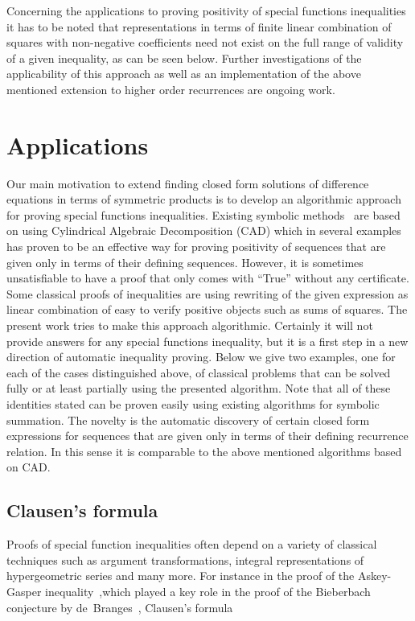\documentclass{article}
\begin{document}
Concerning the applications to proving positivity of special functions inequalities it has
to be noted that representations in terms of finite linear combination of squares with non-negative
coefficients need not exist on the full range of validity of a given inequality, as can be
seen below. Further investigations of the applicability of this approach as well as an
implementation of the above mentioned extension to higher order recurrences are ongoing
work.

\section{Applications}
\label{apps}
Our main motivation to extend finding closed form solutions of difference equations in
terms of symmetric products is to develop an algorithmic approach for proving special
functions inequalities. Existing symbolic methods~\cite{GKIneq,MKSumCracker,MKVP10} are
based on using Cylindrical Algebraic Decomposition (CAD) which in several examples has
proven to be an effective way for proving positivity of sequences that are given only in
terms of their defining sequences. However, it is sometimes unsatisfiable to have a proof
that only comes with ``True'' without any certificate. Some classical proofs of
inequalities are using rewriting of the given expression as linear combination of easy to
verify positive objects such as sums of squares. The present work tries to make this
approach algorithmic. Certainly it will not provide answers for any special functions
inequality, but it is a first step in a new direction of automatic inequality proving.
Below we give two examples, one for each of the cases distinguished above, of classical
problems that can be solved fully or at least partially using the presented algorithm.
Note that all of these identities stated can be proven easily using existing algorithms
for symbolic summation. The novelty is the automatic discovery of certain closed form
expressions for sequences that are given only in terms of their defining recurrence
relation. In this sense it is comparable to the above mentioned algorithms based on CAD.

\subsection{Clausen's formula} \label{Clausen} 

Proofs of special function inequalities often depend on a variety of classical techniques
such as argument transformations, integral representations of hypergeometric series and
many more. For instance in the proof of the Askey-Gasper inequality~\cite{AG76},which
played a key role in the proof of the Bieberbach conjecture by
de~Branges~\cite{deBranges}, Clausen's formula
\end{document}
